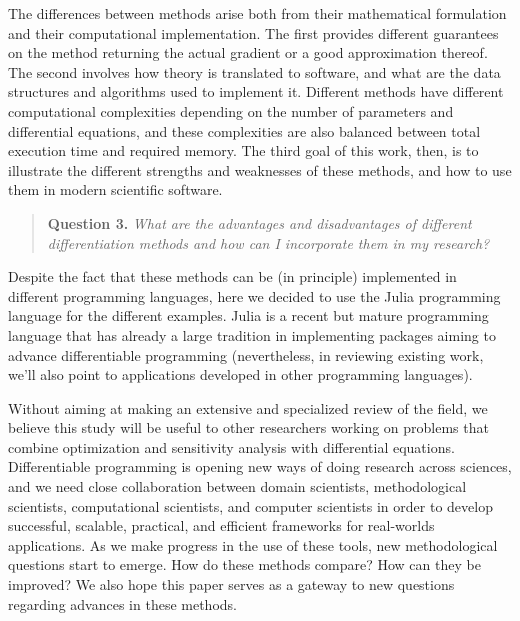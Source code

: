 The differences between methods arise both from their mathematical formulation and their computational implementation. 
The first provides different guarantees on the method returning the actual gradient or a good approximation thereof. 
The second involves how theory is translated to software, and what are the data structures and algorithms used to implement it. 
Different methods have different computational complexities depending on the number of parameters and differential equations, and these complexities are also balanced between total execution time and required memory. 
The third goal of this work, then, is to illustrate the different strengths and weaknesses of these methods, and how to use them in modern scientific software. 
\begin{quote}
    \textbf{Question 3. }
    \textit{What are the advantages and disadvantages of different differentiation methods and how can I incorporate them in my research?}
\end{quote}
Despite the fact that these methods can be (in principle) implemented in different programming languages, here we decided to use the Julia programming language for the different examples. 
Julia is a recent but mature programming language that has already a large tradition in implementing packages aiming to advance differentiable programming \cite{Bezanson_Karpinski_Shah_Edelman_2012, Julialang_2017}
(nevertheless, in reviewing existing work, we'll also point to applications developed in other programming languages).

Without aiming at making an extensive and specialized review of the field, we believe this study will be useful to other researchers working on problems that combine optimization and sensitivity analysis with differential equations.
Differentiable programming is opening new ways of doing research across sciences, and we need close collaboration between domain scientists, methodological scientists, computational scientists, and computer scientists in order to develop successful, scalable, practical, and efficient frameworks for real-worlds applications.
As we make progress in the use of these tools, new methodological questions start to emerge. 
How do these methods compare? How can they be improved? 
We also hope this paper serves as a gateway to new questions regarding advances in these methods. 

